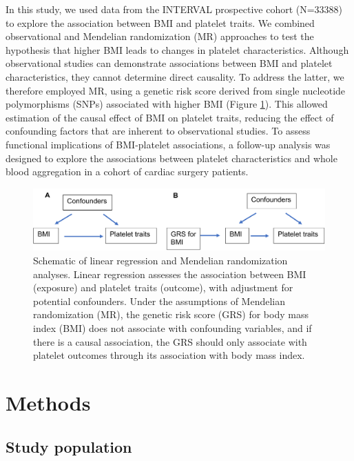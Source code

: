 \documentclass[11pt,twoside]{bristolthesis}
\begin{document}
In this study, we used data from the INTERVAL prospective cohort (N=33388) to explore the association between BMI and platelet traits. We combined observational and Mendelian randomization (MR) approaches to test the hypothesis that higher BMI leads to changes in platelet characteristics. Although observational studies can demonstrate associations between BMI and platelet characteristics, they cannot determine direct causality. To address the latter, we therefore employed MR, using a genetic risk score derived from single nucleotide polymorphisms (SNPs) associated with higher BMI (Figure \ref{fig:Linear-reg-MR}). This allowed estimation of the causal effect of BMI on platelet traits, reducing the effect of confounding factors that are inherent to observational studies. To assess functional implications of BMI-platelet associations, a follow-up analysis was designed to explore the associations between platelet characteristics and whole blood aggregation in a cohort of cardiac surgery patients.
\begin{figure}
\includegraphics{figure/BMI_platelets/obsvMRexample} \caption[Schematic of linear regression and Mendelian randomization analyses]{Schematic of linear regression and Mendelian randomization analyses. Linear regression assesses the association between BMI (exposure) and platelet traits (outcome), with adjustment for potential confounders. Under the assumptions of Mendelian randomization (MR), the genetic risk score (GRS) for body mass index (BMI) does not associate with confounding variables, and if there is a causal association, the GRS should only associate with platelet outcomes through its association with body mass index.}\label{fig:Linear-reg-MR}
\end{figure}
\hypertarget{methods}{%
\section{Methods}\label{methods}}

\hypertarget{study-population}{%
\subsection{Study population}\label{study-population}}
\end{document}
